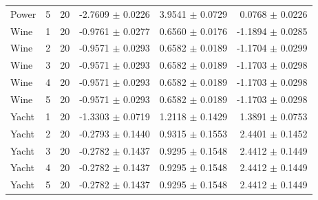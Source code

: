 \begin{tabular}{lrrrrr}
Power & 5 & 20 & -2.7609 $\pm$ 0.0226 & 3.9541 $\pm$ 0.0729 & 0.0768 $\pm$ 0.0226 \\
Wine & 1 & 20 & -0.9761 $\pm$ 0.0277 & 0.6560 $\pm$ 0.0176 & -1.1894 $\pm$ 0.0285 \\
Wine & 2 & 20 & -0.9571 $\pm$ 0.0293 & 0.6582 $\pm$ 0.0189 & -1.1704 $\pm$ 0.0299 \\
Wine & 3 & 20 & -0.9571 $\pm$ 0.0293 & 0.6582 $\pm$ 0.0189 & -1.1703 $\pm$ 0.0298 \\
Wine & 4 & 20 & -0.9571 $\pm$ 0.0293 & 0.6582 $\pm$ 0.0189 & -1.1703 $\pm$ 0.0298 \\
Wine & 5 & 20 & -0.9571 $\pm$ 0.0293 & 0.6582 $\pm$ 0.0189 & -1.1703 $\pm$ 0.0298 \\
Yacht & 1 & 20 & -1.3303 $\pm$ 0.0719 & 1.2118 $\pm$ 0.1429 & 1.3891 $\pm$ 0.0753 \\
Yacht & 2 & 20 & -0.2793 $\pm$ 0.1440 & 0.9315 $\pm$ 0.1553 & 2.4401 $\pm$ 0.1452 \\
Yacht & 3 & 20 & -0.2782 $\pm$ 0.1437 & 0.9295 $\pm$ 0.1548 & 2.4412 $\pm$ 0.1449 \\
Yacht & 4 & 20 & -0.2782 $\pm$ 0.1437 & 0.9295 $\pm$ 0.1548 & 2.4412 $\pm$ 0.1449 \\
Yacht & 5 & 20 & -0.2782 $\pm$ 0.1437 & 0.9295 $\pm$ 0.1548 & 2.4412 $\pm$ 0.1449 \\
\bottomrule
\end{tabular}
